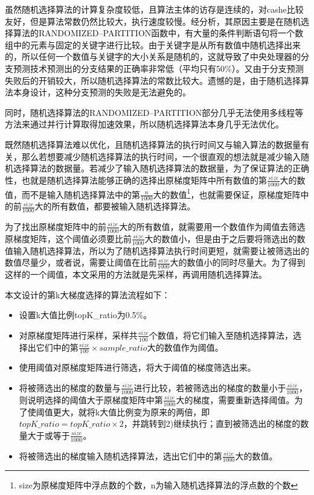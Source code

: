 虽然随机选择算法的计算复杂度较低，且算法主体的访存是连续的，对cashe比较友好，但是算法常数仍然比较大，执行速度较慢。经分析，其原因主要是在随机选择算法的RANDOMIZED--PARTITION函数中，有大量的条件判断语句将一个数组中的元素与固定的关键字进行比较。由于关键字是从所有数值中随机选择出来的，所以任何一个数值与关键字的大小关系是随机的，这就导致了中央处理器的分支预测技术预测出的分支结果的正确率非常低（平均只有50\%）。又由于分支预测失败后的开销较大，所以随机选择算法的常数比较大。遗憾的是，由于随机选择算法本身设计，这种分支预测的失败是无法避免的。

同时，随机选择算法的RANDOMIZED--PARTITION部分几乎无法使用多线程等方法来通过并行计算取得加速效果，所以随机选择算法本身几乎无法优化。

既然随机选择算法难以优化，且随机选择算法的执行时间又与输入算法的数据量有关，那么若想要减少随机选择算法的执行时间，一个很直观的想法就是减少输入随机选择算法的数据量。若减少了输入随机选择算法的数据量，为了保证算法的正确性，也就是随机选择算法能够正确的选择出原梯度矩阵中所有数值的第$\frac{size}{1000}$大的数值，而不是输入随机选择算法中的第$\frac{n}{1000}$大的数值\footnote{size为原梯度矩阵中浮点数的个数，n为输入随机选择算法的浮点数的个数}，也就需要保证，原梯度矩阵中的前$\frac{size}{1000}$大的所有数值，都要被输入随机选择算法。

为了找出原梯度矩阵中的前$\frac{size}{1000}$大的所有数值，就需要用一个数值作为阈值去筛选原梯度矩阵，这个阈值必须要比前$\frac{size}{1000}$大的数值小，但是由于之后要将筛选出的数值输入随机选择算法，所以为了随机选择算法执行时间更短，就需要让被筛选出的数值尽量少，或者说，需要让阈值在比前$\frac{size}{1000}$大的数值小的同时尽量大。为了得到这样的一个阈值，本文采用的方法就是先采样，再调用随机选择算法。

本文设计的第k大梯度选择的算法流程如下：
\begin{itemize}
  \item [1)]
  设置k大值比例topK\_ratio为0.5\%。
  \item [2)]
  对原梯度矩阵进行采样，采样共$\frac{size}{100}$个数值，将它们输入至随机选择算法，选择出它们中的第$\frac{size}{100}\times sample\_ratio$大的数值作为阈值。
  \item [3)]
  使用阈值对原梯度矩阵进行筛选，将大于阈值的梯度筛选出来。
  \item [4)]
  将被筛选出的梯度的数量与$\frac{size}{1000}$进行比较，若被筛选出的梯度的数量小于$\frac{size}{1000}$，则说明选择的阈值大于原梯度矩阵中第$\frac{size}{1000}$大的梯度，需要重新选择阈值。为了使阈值更大，就将k大值比例变为原来的两倍，即$topK\_ratio = topK\_ratio \times 2$，并跳转到2)继续执行；直到被筛选出的梯度的数量大于或等于$\frac{size}{1000}$。
  \item [5)]
  将被筛选出的梯度输入随机选择算法，选出它们中的第$\frac{size}{1000}$大的数值。
\end{itemize}

